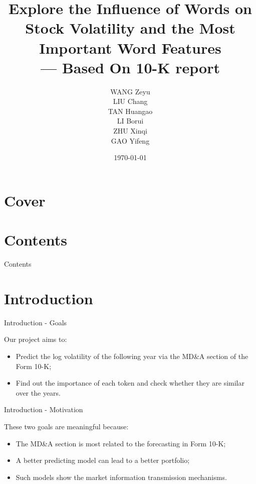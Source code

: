 \documentclass{beamer}
\title{Explore the Influence of Words on Stock Volatility and the Most Important Word Features \\ --- Based On 10-K report
}
\author{
  \parbox{0.3\textwidth}{
    \centering WANG Zeyu
    \vspace{.25cm}
  }
  \parbox{0.3\textwidth}{
    \centering LIU Chang
    \vspace{.25cm}
  }
  \parbox{0.3\textwidth}{
    \centering TAN Huangao
    \vspace{.25cm}
  }
  \parbox{0.3\textwidth}{
    \centering LI Borui
  }
  \parbox{0.3\textwidth}{
    \centering ZHU Xinqi
  }
  \parbox{0.3\textwidth}{
    \centering GAO Yifeng
  }
}
\date{\today}
\begin{document}
\section*{Cover}
\frame{\titlepage}

\section*{Contents}
\begin{frame}{Contents}
  \tableofcontents
\end{frame}

\section{Introduction}

\begin{frame}{Introduction - Goals}

  Our project aims to: \vspace{.25cm}
  \begin{itemize}
    \item Predict the log volatility of the following year via the MD\&A section of the Form 10-K; \vspace{.25cm}
    \item Find out the importance of each token and check whether they are similar over the years.
  \end{itemize}

\end{frame}

\begin{frame}{Introduction - Motivation}

  These two goals are meaningful because: \vspace{.25cm}

  \begin{itemize}
    \item The MD\&A section is most related to the forecasting in Form 10-K; \vspace{.25cm}
    \item A better predicting model can lead to a better portfolio; \vspace{.25cm}
    \item Such models show the market information transmission mechanisms. \vspace{.25cm}
  \end{itemize}

\end{frame}
\end{document}
